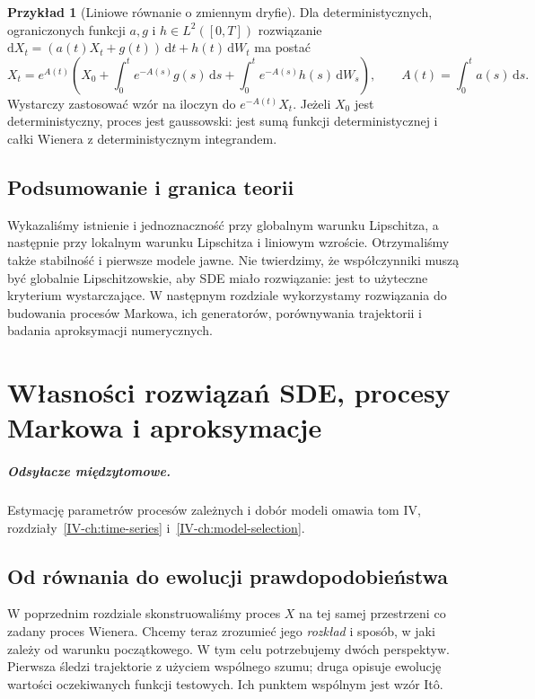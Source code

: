 \documentclass[11pt,a4paper,oneside]{report}
\numberwithin{equation}{chapter}
\theoremstyle{plain}
\theoremstyle{definition}
\newtheorem{przyklad}{Przykład}[chapter]
\theoremstyle{remark}
\newcommand{\dd}{\mathrm{d}}
\begin{document}
\begin{przyklad}[Liniowe równanie o zmiennym dryfie]
Dla deterministycznych, ograniczonych funkcji $a,g$
i $h\in L^2([0,T])$ rozwiązanie
$\dd X_t=(a(t)X_t+g(t))\,\dd t+h(t)\,\dd W_t$
ma postać
\[
X_t=e^{A(t)}\left(X_0+\int_0^te^{-A(s)}g(s)\,\dd s
+\int_0^te^{-A(s)}h(s)\,\dd W_s\right),
\qquad A(t)=\int_0^t a(s)\,\dd s.
\]
Wystarczy zastosować wzór na iloczyn do
$e^{-A(t)}X_t$. Jeżeli $X_0$ jest deterministyczny,
proces jest gaussowski: jest sumą funkcji deterministycznej
i całki Wienera z deterministycznym integrandem.
\end{przyklad}

\section{Podsumowanie i granica teorii}
Wykazaliśmy istnienie i jednoznaczność przy globalnym
warunku Lipschitza, a następnie przy lokalnym warunku
Lipschitza i liniowym wzroście. Otrzymaliśmy także
stabilność i pierwsze modele jawne. Nie twierdzimy,
że współczynniki muszą być globalnie Lipschitzowskie,
aby SDE miało rozwiązanie: jest to użyteczne kryterium
wystarczające. W następnym rozdziale wykorzystamy
rozwiązania do budowania procesów Markowa, ich generatorów,
porównywania trajektorii i badania aproksymacji numerycznych.
\chapter{Własności rozwiązań SDE, procesy Markowa i aproksymacje}
\label{ch:sde-properties}
\paragraph{Odsyłacze międzytomowe.} Estymację parametrów procesów zależnych i dobór modeli omawia tom IV, rozdziały~\ref{IV-ch:time-series} i~\ref{IV-ch:model-selection}.


\section{Od równania do ewolucji prawdopodobieństwa}
W poprzednim rozdziale skonstruowaliśmy proces $X$ na tej
samej przestrzeni co zadany proces Wienera. Chcemy teraz
zrozumieć jego \emph{rozkład} i sposób, w jaki zależy od
warunku początkowego. W tym celu potrzebujemy dwóch
perspektyw. Pierwsza śledzi trajektorie z użyciem wspólnego
szumu; druga opisuje ewolucję wartości oczekiwanych
funkcji testowych. Ich punktem wspólnym jest wzór Itô.
\end{document}
